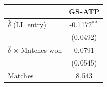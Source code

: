 \begin{tabular}{lc}
\toprule
 & GS-ATP \\
\midrule
$\hat{\delta}$ (LL entry) & -0.1172$^{**}$ \\
 & (0.0492) \\
$\hat{\delta}$ $\times$ Matches won & 0.0791 \\
 & (0.0545) \\
\midrule
Matches & 8,543 \\
\bottomrule
\end{tabular}
